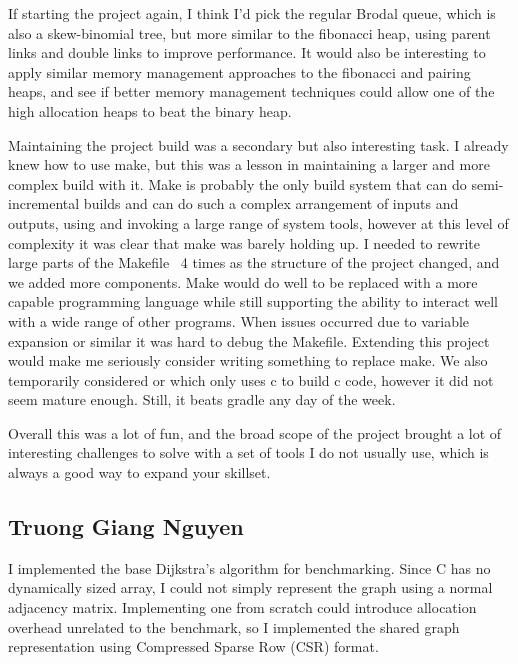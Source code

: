 If starting the project again, I think I'd pick the regular Brodal queue, which
is also a skew-binomial tree, but more similar to the fibonacci heap, using
parent links and double links to improve performance. It would also be
interesting to apply similar memory management approaches to the fibonacci and
pairing heaps, and see if better memory management techniques could allow one of
the high allocation heaps to beat the binary heap.

Maintaining the project build was a secondary but also interesting task. I
already knew how to use make, but this was a lesson in maintaining a larger and
more complex build with it. Make is probably the only build system that can do
semi-incremental builds and can do such a complex arrangement of inputs and
outputs, using and invoking a large range of system tools, however at this level
of complexity it was clear that make was barely holding up. I needed to rewrite
large parts of the Makefile ~4 times as the structure of the project changed,
and we added more components. Make would do well to be replaced with a more
capable programming language while still supporting the ability to interact well
with a wide range of other programs. When issues occurred due to variable
expansion or similar it was hard to debug the Makefile. Extending this project
would make me seriously consider writing something to replace make. We also
temporarily considered  or  which only uses c to
build c code, however it did not seem mature enough. Still, it beats gradle any
day of the week.

Overall this was a lot of fun, and the broad scope of the project brought a lot
of interesting challenges to solve with a set of tools I do not usually use,
which is always a good way to expand your skillset.

\subsection{Truong Giang Nguyen}

I implemented the base Dijkstra's algorithm for benchmarking. Since C has no
dynamically sized array, I could not simply represent the graph using a normal
adjacency matrix. Implementing one from scratch could introduce allocation
overhead unrelated to the benchmark, so I implemented the shared graph
representation using Compressed Sparse Row (CSR) format.


